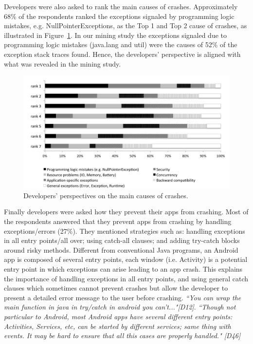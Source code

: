 
Developers were also asked to rank the main causes of crashes. Approximately 68\% of the respondents ranked the exceptions signaled by programming logic mistakes, e.g. NullPointerExceptions, as the Top 1 and Top 2 cause of crashes, as illustrated in Figure~\ref{fig:ranking}. In our mining study the exceptions signaled due to programming logic mistakes (java.lang and util) were the causes of 52\% of the exception stack traces found. Hence, the developers' perspective is aligned with what was revealed in the mining study.
\begin{figure} 
\centering \includegraphics[scale=0.60]{ranking.png}
\caption{Developers' perspectives on the main causes of crashes.}\label{fig:ranking} 
\end{figure}


Finally developers were asked how they prevent their apps from crashing. Most of the respondents answered that they prevent apps from crashing by handling exceptions/errors (27\%). They mentioned strategies such as: handling exceptions in all entry points/all over; using catch-all clauses; and adding try-catch blocks around risky methods. Different from conventional Java programs, an Android app is composed of several entry points, each window (i.e. Activity) is a potential entry point in which exceptions can arise leading to an app crash. This explains the importance of handling exceptions in all entry points, and using general catch clauses which sometimes cannot prevent crashes but allow the developer to present a detailed error message to the user before crashing.  \emph{``You can wrap the main function in java in try/catch in android you can't..."[D12]}. \emph{``Though not particular to Android, most Android apps have several different entry points: Activities, Services, etc, can be started by different services; same thing with events. It may be hard to ensure that all this cases are properly handled." [D46]}

